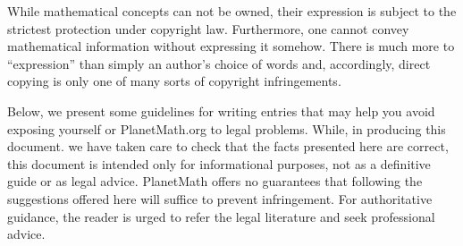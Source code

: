 While mathematical concepts can not be owned, their expression is
subject to the strictest protection under copyright law. Furthermore,
one cannot convey mathematical information without expressing it
somehow. There is much more to ``expression'' than simply an
author's choice of words and, accordingly, direct copying is only one
of many sorts of copyright infringements.

Below, we present some guidelines for writing entries that may help
you avoid exposing yourself or PlanetMath.org to legal problems.
While, in producing this document. we have taken care to check that
the facts presented here are correct, this document is intended
only for informational purposes, not as a definitive guide or as legal
advice.  PlanetMath offers no guarantees that following the suggestions
offered here will suffice to prevent infringement.  For authoritative
guidance, the reader is urged to refer the legal literature and seek
professional advice.


